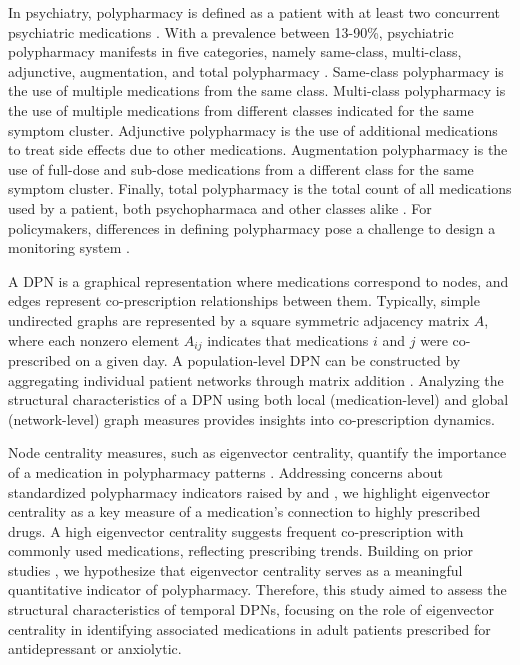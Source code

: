 \documentclass[
  authoryear,
  review]{elsarticle}
\begin{document}
In psychiatry, polypharmacy is defined as a patient with at least two
concurrent psychiatric medications \citep{Shrivastava2013}. With a
prevalence between 13-90\%, psychiatric polypharmacy manifests in five
categories, namely same-class, multi-class, adjunctive, augmentation,
and total polypharmacy \citep{Shrivastava2013}. Same-class polypharmacy
is the use of multiple medications from the same class. Multi-class
polypharmacy is the use of multiple medications from different classes
indicated for the same symptom cluster. Adjunctive polypharmacy is the
use of additional medications to treat side effects due to other
medications. Augmentation polypharmacy is the use of full-dose and
sub-dose medications from a different class for the same symptom
cluster. Finally, total polypharmacy is the total count of all
medications used by a patient, both psychopharmaca and other classes
alike \citep{Shrivastava2013}. For policymakers, differences in defining
polypharmacy pose a challenge to design a monitoring system
\citep{Sirois2016}.

A DPN is a graphical representation where medications correspond to
nodes, and edges represent co-prescription relationships between them.
Typically, simple undirected graphs are represented by a square
symmetric adjacency matrix \(A\), where each nonzero element \(A_{ij}\)
indicates that medications \(i\) and \(j\) were co-prescribed on a given
day. A population-level DPN can be constructed by aggregating individual
patient networks through matrix addition \citep{Cavallo2012}. Analyzing
the structural characteristics of a DPN using both local
(medication-level) and global (network-level) graph measures provides
insights into co-prescription dynamics.

Node centrality measures, such as eigenvector centrality, quantify the
importance of a medication in polypharmacy patterns \citep{Askar2021}.
Addressing concerns about standardized polypharmacy indicators raised by
\citet{Sirois2016} and \citet{Delara2022}, we highlight eigenvector
centrality as a key measure of a medication's connection to highly
prescribed drugs. A high eigenvector centrality suggests frequent
co-prescription with commonly used medications, reflecting prescribing
trends. Building on prior studies \citep{Cavallo2012, Bazzoni2015}, we
hypothesize that eigenvector centrality serves as a meaningful
quantitative indicator of polypharmacy. Therefore, this study aimed to
assess the structural characteristics of temporal DPNs, focusing on the
role of eigenvector centrality in identifying associated medications in
adult patients prescribed for antidepressant or anxiolytic.
\end{document}
